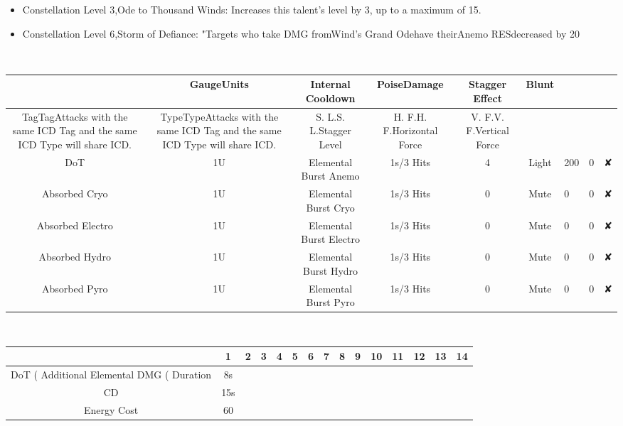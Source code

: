 \documentclass[a4paper,12pt]{article}
\begin{document}
\begin{itemize}
\item Constellation Level 3,Ode to Thousand Winds: Increases this talent's level by 3, up to a maximum of 15.
\item Constellation Level 6,Storm of Defiance: "Targets who take DMG fromWind's Grand Odehave theirAnemo RESdecreased by 20%
\end{itemize}\\ \par \vspace{0.5cm}

\begin{tabular}{|c|c|c|c|c|c|} \hline
 & GaugeUnits & Internal Cooldown & PoiseDamage & Stagger Effect & Blunt \\
 \hline
TagTagAttacks with the same ICD Tag and the same ICD Type will share ICD. & TypeTypeAttacks with the same ICD Tag and the same ICD Type will share ICD. & S. L.S. L.Stagger Level & H. F.H. F.Horizontal Force & V. F.V. F.Vertical Force \\
DoT & 1U & Elemental Burst Anemo & 1s/3 Hits & 4 & Light & 200 & 0 & ✘ \\
Absorbed Cryo & 1U & Elemental Burst Cryo & 1s/3 Hits & 0 & Mute & 0 & 0 & ✘ \\
Absorbed Electro & 1U & Elemental Burst Electro & 1s/3 Hits & 0 & Mute & 0 & 0 & ✘ \\
Absorbed Hydro & 1U & Elemental Burst Hydro & 1s/3 Hits & 0 & Mute & 0 & 0 & ✘ \\
Absorbed Pyro & 1U & Elemental Burst Pyro & 1s/3 Hits & 0 & Mute & 0 & 0 & ✘ \\
\end{tabular}\\ \par \vspace{0.5cm}

\begin{tabular}{|c|c|c|c|c|c|c|c|c|c|c|c|c|c|c|} \hline
 & 1 & 2 & 3 & 4 & 5 & 6 & 7 & 8 & 9 & 10 & 11 & 12 & 13 & 14 \\
 \hline
DoT (%
Additional Elemental DMG (%
Duration & 8s \\
CD & 15s \\
Energy Cost & 60 \\
\end{tabular}\\ \par \vspace{0.5cm}
\end{document}
